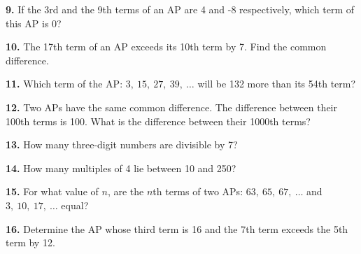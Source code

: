 \documentclass[12pt]{article}
\begin{document}
\textbf{9.} If the 3rd and the 9th terms of an AP are 4 and -8 respectively, which term of this AP is 0?

\textbf{10.} The 17th term of an AP exceeds its 10th term by 7. Find the common difference.

\textbf{11.} Which term of the AP: \( 3,\ 15,\ 27,\ 39,\ \ldots \) will be 132 more than its 54th term?

\textbf{12.} Two APs have the same common difference. The difference between their 100th terms is 100. What is the difference between their 1000th terms?

\textbf{13.} How many three-digit numbers are divisible by 7?

\textbf{14.} How many multiples of 4 lie between 10 and 250?

\textbf{15.} For what value of \( n \), are the \( n \)th terms of two APs: \( 63,\ 65,\ 67,\ \ldots \) and \( 3,\ 10,\ 17,\ \ldots \) equal?

\textbf{16.} Determine the AP whose third term is 16 and the 7th term exceeds the 5th term by 12.
\end{document}
